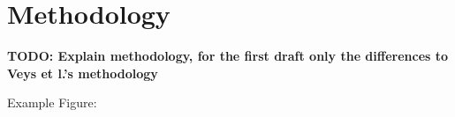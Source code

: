 \section{Methodology}
\label{sec:method}

\textbf{TODO: Explain methodology, for the first draft only the differences to Veys et l.'s methodology}

Example Figure:


